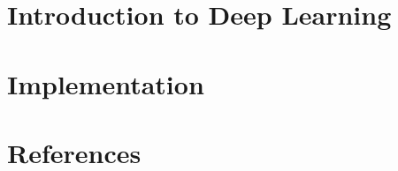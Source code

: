 % 

\section[Intro]{Introduction to Deep Learning}

% 
% 
% 

\section[Libs]{Implementation}
% 

% 

% 
% 

% 
% 

 
 
% 


 \section[Refs]{References}
 
